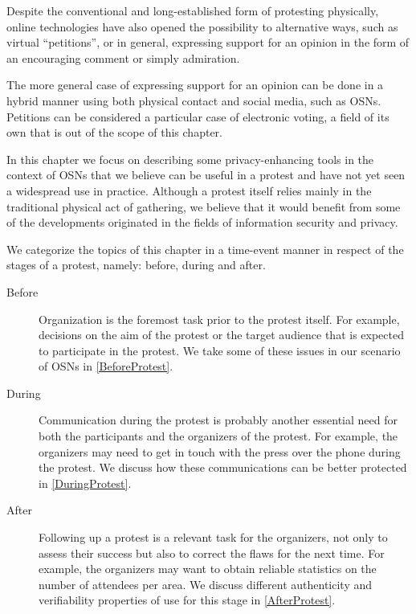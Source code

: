 Despite the conventional and long-established form of protesting physically, online 
technologies have also opened the possibility to alternative ways, such as virtual 
\enquote{petitions}, or in general, expressing support for an opinion in the form 
of an encouraging comment or simply admiration. 

The more general case of expressing support for an opinion can be done in a hybrid 
manner using both physical contact and social media, such as \acp{OSN}. Petitions 
can be considered a particular case of electronic voting, a field of its own that 
is out of the scope of this chapter. 

In this chapter we focus on describing some privacy-enhancing tools in the context 
of \acp{OSN} that we believe can be useful in a protest and have not yet seen a 
widespread use in practice. Although a protest itself relies mainly in the traditional 
physical act of gathering, we believe that it would benefit from some of the developments 
originated in the fields of information security and privacy.

We categorize the topics of this chapter in a time-event manner in respect of the 
stages of a protest, namely: before, during and after.
\begin{description}
  \item[Before]
    Organization is the foremost task prior to the protest itself. 
    For example, decisions on the aim of the protest or the target audience 
    that is expected to participate in the protest.
    We take some of these issues in our scenario of \acp{OSN} in 
    \cref{BeforeProtest}.

  \item[During]
    Communication during the protest is probably another essential need for 
    both the participants and the organizers of the protest.
    For example, the organizers may need to get in touch with the press over 
    the phone during the protest.
    We discuss how these communications can be better protected in 
    \cref{DuringProtest}.

  \item[After]
    Following up a protest is a relevant task for the organizers, not only to 
    assess their success but also to correct the flaws for the next time.
    For example, the organizers may want to obtain reliable statistics on the 
    number of attendees per area.
    We discuss different authenticity and verifiability properties of use for 
    this stage in \cref{AfterProtest}.
\end{description}

